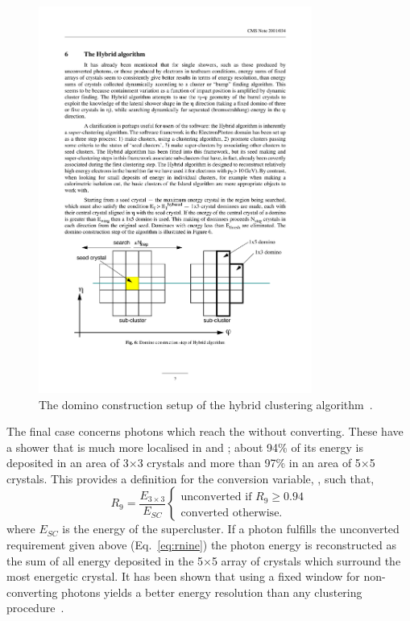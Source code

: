 \begin{figure}
  \includegraphics[width=0.8\textwidth]{cms_experiment/plots/hybrid_clustering.pdf}
  \caption[A schematic of the domino clustering algorithm]{The domino construction setup of the hybrid clustering algorithm~\cite{ecal_electron_reco}.}
  \label{fig:hybrid_algo}
\end{figure}

The final case concerns photons which reach the \ECAL without converting. These have a shower that is much more localised in \eta and \phi; about 94\% of its energy is deposited in an area of 3$\times$3 crystals and more than 97\% in an area of 5$\times$5 crystals. This provides a definition for the conversion variable, \rnine, such that, 
\begin{equation}
	R_{9} = \frac{E_{3\times3}}{E_{SC}} 
	\begin{cases}
		\text{unconverted if } R_9\geq0.94 \\
		\text{converted otherwise}.
	\end{cases}
  \label{eq:rnine}
\end{equation}
where $E_{SC}$ is the energy of the supercluster. If a photon fulfills the unconverted requirement given above (Eq.~\ref{eq:rnine}) the photon energy is reconstructed as the sum of all energy deposited in the 5$\times$5 array of crystals which surround the most energetic crystal. It has been shown that using a fixed window for non-converting photons yields a better energy resolution than any clustering procedure~\cite{ecal_electron_reco}.

